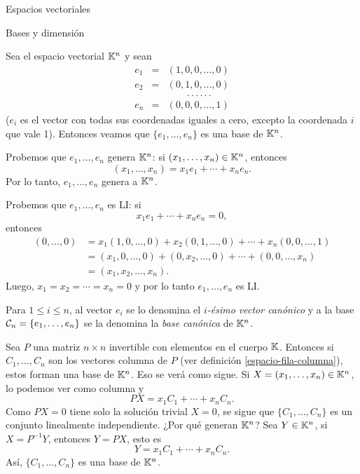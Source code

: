 \begin{chapter}{Espacios vectoriales}
\begin{section}{Bases y dimensi\'on}
\begin{ejemplo*} Sea el espacio vectorial $\mathbb K^n$ y sean
    \begin{equation*}
    \begin{array}{rcl}
    e_1 &=& (1,0,0,\ldots,0) \\
    e_2 &=& (0,1,0,\ldots,0) \\
    &&\qquad.\,.\,.\,.\,.\,.\,\\ 
    e_n&=& (0,0,0,\ldots,1)
    \end{array}
    \end{equation*}
    ($e_i$ es el vector con todas sus coordenadas iguales a cero,  excepto  la coordenada $i$ que vale 1). Entonces veamos que  $\{e_1,\ldots,e_n\}$ es una base de $\mathbb K^n$.
    
    Probemos que $e_1,\ldots,e_n$ genera  $\mathbb K^n$: si $(x_1,\ldots,x_n) \in \mathbb K^n$,  entonces
        $$
        (x_1,\ldots,x_n) = x_1e_1+\cdots+x_ne_n.
        $$
        Por lo tanto, $e_1,\ldots,e_n$ genera a  $\mathbb K^n$.
        
        Probemos que $e_1,\ldots,e_n$ es LI: si 
        $$
        x_1e_1+\cdots+x_ne_n =0,
        $$
        entonces
        \begin{align*}
            (0,\ldots,0) &= x_1(1,0,\ldots,0)+ x_2(0,1,\ldots,0)+\cdots+x_n(0,0,\ldots,1)\\ 
            &=  (x_1,0,\ldots,0)+(0,x_2,\ldots,0)+\cdots+(0,0,\ldots,x_n)\\ &= (x_1,x_2,\ldots,x_n).
        \end{align*}
        Luego, $x_1= x_2=\cdots=x_n =0$ y por lo tanto $e_1,\ldots,e_n$ es LI.
        
        Para $1 \le i \le n$, al vector $e_i$ se lo denomina el \textit{$i$-ésimo vector canónico}  y a la base $\mathcal{C}_n = \left\{e_1,\ldots,e_n \right\}$ se la denomina la \textit{base canónica} de $\mathbb K^n$. 
\end{ejemplo*}
 
 
 \begin{ejemplo*}
     Sea $P$ una matriz $n \times n$ invertible con elementos en el cuerpo $\mathbb K$. Entonces si $C_1,\ldots,C_n$ son los vectores columna de $P$ (ver definición  \ref{espacio-fila-columna}), estos forman una base de $\mathbb K^n$. Eso se verá como sigue. Si $X = (x_1,\ldots,x_n) \in \mathbb K^n$, lo podemos ver como columna y 
     $$
     PX=x_1C_1+\cdots+x_nC_n.
     $$
     Como $PX=0$ tiene solo la solución trivial $X= 0$, se sigue que $\{C_1,\ldots,C_n\}$ es un conjunto linealmente independiente. ¿Por qué generan $\mathbb K^n$? Sea $Y \in \mathbb K^n$, si $X = P^{-1} Y$, entonces $Y = PX$, esto es
     $$
     Y=x_1C_1+\cdots+x_nC_n.
     $$
     Así, $\{C_1,\ldots,C_n\}$ es una base de $\mathbb K^n$.
 \end{ejemplo*}



\end{section}
\end{chapter}
